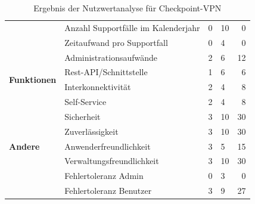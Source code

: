 \begin{table}
\begin{tabular}{l|l|l|l|r|}
		~                                      & Anzahl Supportfälle im Kalenderjahr & 0                   & 10                 & 0                 \\
		~                                      & Zeitaufwand pro Supportfall         & 0                   & 4                  & 0                 \\
		~                                      & Administrationsaufwände             & 2                   & 6                  & 12                \\
		\cline{2-5}
		\multirow{2}{6em}{\textbf{Funktionen}} & Rest-API/Schnittstelle              & 1                   & 6                  & 6                 \\
		~                                      & Interkonnektivität                  & 2                   & 4                  & 8                 \\
		\cline{2-5}
		\multirow{7}{6em}{\textbf{Andere}}     & Self-Service                        & 2                   & 4                  & 8                 \\
		~                                      & Sicherheit                          & 3                   & 10                 & 30                \\
		~                                      & Zuverlässigkeit                     & 3                   & 10                 & 30                \\
		~                                      & Anwenderfreundlichkeit              & 3                   & 5                  & 15                \\
		~                                      & Verwaltungsfreundlichkeit           & 3                   & 10                 & 30                \\
		~                                      & Fehlertoleranz Admin                & 0                   & 3                  & 0                 \\
		~                                      & Fehlertoleranz Benutzer             & 3                   & 9                  & 27                \\
		\cline{2-5}
	\end{tabular}
	\caption[Ergebnis der Nutzwertanalyse für Checkpoint-VPN]{Ergebnis der Nutzwertanalyse für Checkpoint-VPN}
	\label{tab:ErgebnisCheckpoint}
\end{table}

